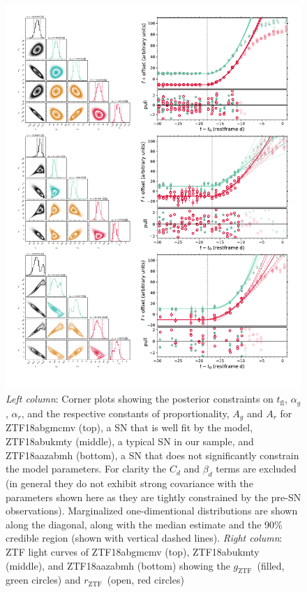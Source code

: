 \documentclass[twocolumn]{./aastex63}
\newcommand{\rztf}{$r_\mathrm{ZTF}$}
\newcommand{\gztf}{$g_\mathrm{ZTF}$}
\newcommand{\tfl}{$t_\mathrm{fl}$}
\begin{document}
\begin{figure}
    \centering
    \includegraphics[width=5.75in]{./figures/corner_LC.pdf}
    \caption{\textit{Left column}: Corner plots showing the posterior
    constraints on \tfl, $\alpha_g$, $\alpha_r$, and the respective constants
    of proportionality, $A_g$ and $A_r$ for ZTF18abgmcmv (top), a SN that is
    well fit by the model, ZTF18abukmty (middle), a typical SN in our sample,
    and ZTF18aazabmh (bottom), a SN that does not significantly constrain the
    model parameters. For clarity the $C_d$ and $\beta_d$ terms are excluded
    (in general they do not exhibit strong covariance with the parameters
    shown here as they are tightly constrained by the pre-SN observations).
    Marginalized one-dimentional distributions are shown along the diagonal,
    along with the median estimate and the 90\% credible region (shown with
    vertical dashed lines). \textit{Right column}: ZTF light curves of
    ZTF18abgmcmv (top), ZTF18abukmty (middle), and ZTF18aazabmh (bottom)
    showing the \gztf\ (filled, green circles) and \rztf\ (open, red circles)
}
\end{figure}
\end{document}
